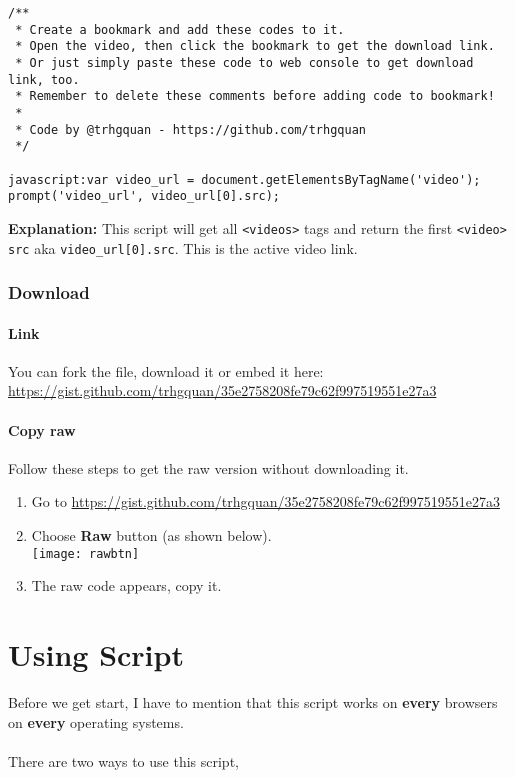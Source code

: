\documentclass{article}
\begin{document}
\begin{verbatim}
/**
 * Create a bookmark and add these codes to it.
 * Open the video, then click the bookmark to get the download link.
 * Or just simply paste these code to web console to get download link, too.
 * Remember to delete these comments before adding code to bookmark!
 *
 * Code by @trhgquan - https://github.com/trhgquan
 */

javascript:var video_url = document.getElementsByTagName('video');
prompt('video_url', video_url[0].src);
\end{verbatim}
\textbf{Explanation:} This script will get all \verb|<videos>| tags and return the first \verb|<video>| \verb|src| aka \verb|video_url[0].src|. This is the active video link.

\section{Download}
\subsection{Link}
You can fork the file, download it or embed it here:
\\
\href{https://gist.github.com/trhgquan/35e2758208fe79c62f997519551e27a3}{https://gist.github.com/trhgquan/35e2758208fe79c62f997519551e27a3}

\subsection{Copy raw}\label{copyraw}
Follow these steps to get the raw version without downloading it.
\begin{enumerate}
\item Go to  \href{https://gist.github.com/trhgquan/35e2758208fe79c62f997519551e27a3}{https://gist.github.com/trhgquan/35e2758208fe79c62f997519551e27a3}\cite{scriptlink}
\item Choose \textbf{Raw} button (as shown below).
\\
\texttt{[image: rawbtn]}
\item The raw code appears, copy it.
\end{enumerate}

\part{Using Script}
Before we get start, I have to mention that this script works on \textbf{every} browsers on \textbf{every} operating systems.
\\\\
There are two ways to use this script,
\end{document}
